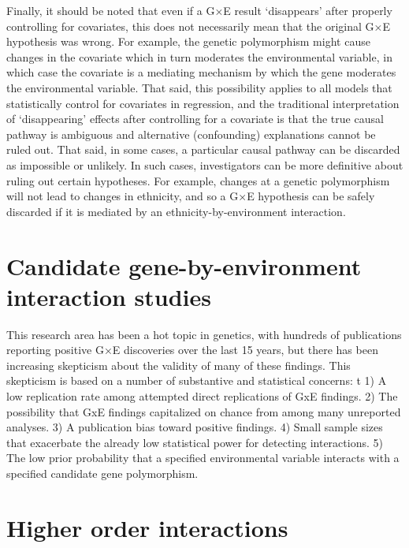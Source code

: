 \documentclass[
]{book}
\begin{document}
Finally, it should be noted that even if a G×E result `disappears' after properly controlling for covariates, this does not necessarily mean that the original G×E hypothesis was wrong. For example, the genetic polymorphism might cause changes in the covariate which in turn moderates the environmental variable, in which case the covariate is a mediating mechanism by which the gene moderates the environmental variable. That said, this possibility applies to all models that statistically control for covariates in regression, and the traditional interpretation of `disappearing' effects after controlling for a covariate is that the true causal pathway is ambiguous and alternative (confounding) explanations cannot be ruled out. That said, in some cases, a particular causal pathway can be discarded as impossible or unlikely. In such cases, investigators can be more definitive about ruling out certain hypotheses. For example, changes at a genetic polymorphism will not lead to changes in ethnicity, and so a G×E hypothesis can be safely discarded if it is mediated by an ethnicity-by-environment interaction.

\hypertarget{candidate-gene-by-environment-interaction-studies}{%
\section{Candidate gene-by-environment interaction studies}\label{candidate-gene-by-environment-interaction-studies}}

This research area has been a hot topic in genetics, with hundreds of publications reporting positive G×E discoveries over the last 15 years, but there has been increasing skepticism about the validity of many of these findings. This skepticism is based on a number of substantive and statistical concerns:
t
1) A low replication rate among attempted direct replications of GxE findings.
2) The possibility that GxE findings capitalized on chance from among many unreported analyses.
3) A publication bias toward positive findings.
4) Small sample sizes that exacerbate the already low statistical power for detecting interactions.
5) The low prior probability that a specified environmental variable interacts with a specified candidate gene polymorphism.

\hypertarget{higher-order-interactions}{%
\section{Higher order interactions}\label{higher-order-interactions}}
\end{document}
